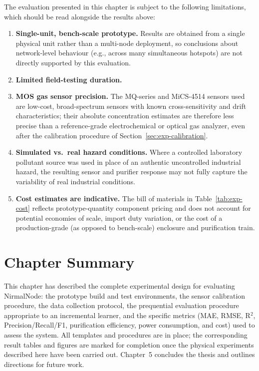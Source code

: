The evaluation presented in this chapter is subject to the following limitations, which should be read alongside the results above:

\begin{enumerate}
    \item \textbf{Single-unit, bench-scale prototype.} Results are obtained from a single physical unit rather than a multi-node deployment, so conclusions about network-level behaviour (e.g., across many simultaneous hotspots) are not directly supported by this evaluation.
    \item \textbf{Limited field-testing duration.} 
    \item \textbf{MOS gas sensor precision.} The MQ-series and MiCS-4514 sensors used are low-cost, broad-spectrum sensors with known cross-sensitivity and drift characteristics; their absolute concentration estimates are therefore less precise than a reference-grade electrochemical or optical gas analyzer, even after the calibration procedure of Section~\ref{sec:exp-calibration}.
    \item \textbf{Simulated vs.\ real hazard conditions.} Where a controlled laboratory pollutant source was used in place of an authentic uncontrolled industrial hazard, the resulting sensor and purifier response may not fully capture the variability of real industrial conditions.
    \item \textbf{Cost estimates are indicative.} The bill of materials in Table~\ref{tab:exp-cost} reflects prototype-quantity component pricing and does not account for potential economies of scale, import duty variation, or the cost of a production-grade (as opposed to bench-scale) enclosure and purification train.
\end{enumerate}

\section{Chapter Summary}
\label{sec:exp-summary}

This chapter has described the complete experimental design for evaluating NirmalNode: the prototype build and test environments, the sensor calibration procedure, the data collection protocol, the prequential evaluation procedure appropriate to an incremental learner, and the specific metrics (MAE, RMSE, R$^2$, Precision/Recall/F1, purification efficiency, power consumption, and cost) used to assess the system. All templates and procedures are in place; the corresponding result tables and figures are marked for completion once the physical experiments described here have been carried out. Chapter~5 concludes the thesis and outlines directions for future work.
